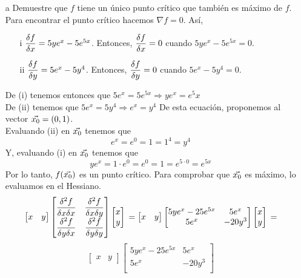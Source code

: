 \documentclass[a4paper,12pt]{article}
\begin{document}
\begin{itemize}
	\item[a] Demuestre que  $f$ tiene un único punto crítico que también es máximo de $f$.
	Para encontrar el punto crítico hacemos $\nabla f = 0$. Así,
	\begin{itemize}
		\item[i] $\dfrac{\delta f}{\delta x} = 5ye^x-5e^{5x}$. Entonces, $\dfrac{\delta f}{\delta x} = 0$ cuando $5ye^x-5e^{5x} = 0$.
		\item[ii]$\dfrac{\delta f}{\delta y} = 5e^x-5y^4$. Entonces, $\dfrac{\delta f}{\delta y} = 0$ cuando $5e^x-5y^4 = 0$.
	\end{itemize}
	De (i) tenemos entonces que $5e^x = 5e^{5x} \Rightarrow ye^x = e^5x$\\
	De (ii) tenemos que $5e^x = 5y^4 \Rightarrow e^x = y^4$ De esta ecuación, proponemos al vector $\vec{x_0} = (0,1)$.\\
	Evaluando (ii) en $\vec{x_0}$ tenemos que
	$$ e^x = e^0 = 1 = 1^4 = y^4$$
	Y, evaluando (i) en $\vec{x_0}$ tenemos que
	$$ye^x = 1\cdot e^0 = e^0 = 1 = e^{5\cdot 0} = e^{5x}$$
	Por lo tanto, $f(\vec{x_0})$ es un punto crítico.
	Para comprobar que $\vec{x_0}$ es máximo, lo evaluamos en el Hessiano.
	\[
	\begin{bmatrix}
	x & y
	\end{bmatrix}
	\begin{bmatrix}
	    \dfrac{\delta ^2 f}{\delta x \delta x} & \dfrac{\delta ^2 f}{\delta x \delta y}\\
		\dfrac{\delta ^2 f}{\delta y \delta x} & \dfrac{\delta ^2 f}{\delta y \delta y}\\
	\end{bmatrix}
	\begin{bmatrix}
	x \\ y
	\end{bmatrix}\\
	=
	\begin{bmatrix}
	x & y
	\end{bmatrix}
	\begin{bmatrix}
	    5ye^x - 25e^{5x} & 5e^x\\
		5e^x & -20y^3\\
	\end{bmatrix}
	\begin{bmatrix}
	x \\ y
	\end{bmatrix}\\
	=
	\]
	\[
	\begin{bmatrix}
	x & y
	\end{bmatrix}
	\begin{bmatrix}
	    5ye^x - 25e^{5x} & 5e^x\\
		5e^x & -20y^3\\

\end{bmatrix}\]
\end{itemize}
\end{document}
